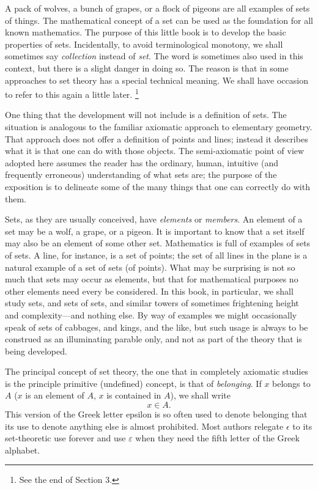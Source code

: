   A pack of wolves, a bunch of grapes, or a flock of pigeons are all examples of sets of things. 
 The mathematical concept of a set can be used as the foundation for all known mathematics. 
 The purpose of this little book is to develop the basic properties of sets. 
 Incidentally, to avoid terminological monotony, we shall sometimes say \textit{collection} instead of \textit{set}. 
 The word  is sometimes also used in this context, but there is a slight danger in doing so. 
 The reason is that in some approaches to set theory  has a special technical meaning. 
 We shall have occasion to refer to this again a little later. 
   \footnote{
     See the end of Section 3. 
   }


 One thing that the development will not include is a definition of sets. 
 The situation is analogous to the familiar axiomatic approach to elementary geometry. 
 That approach does not offer a definition of points and lines; instead it describes what it is that one can do with those objects. 
 The semi-axiomatic point of view adopted here assumes the reader has the ordinary, human, intuitive (and frequently erroneous) understanding of what sets are; the purpose of the exposition is to delineate some of the many things that one can correctly do with them.


  Sets, as they are usually conceived, have \textit{elements} or \textit{members}. 
 An element of a set may be a wolf, a grape, or a pigeon. 
 It is important to know that a set itself may also be an element of some other set. 
 Mathematics is full of examples of sets of sets. 
 A line, for instance, is a set of points; the set of all lines in the plane is a natural example of a set of sets (of points). 
 What may be surprising is not so much that sets may occur as elements, but that for mathematical purposes no other elements need every be considered. 
 In this book, in particular, we shall study sets, and sets of sets, and similar towers of sometimes frightening height and complexity---and nothing else. 
 By way of examples we might occasionally speak of sets of cabbages, and kings, and the like, but such usage is always to be construed as an illuminating parable only, and not as part of the theory that is being developed.


  The principal concept of set theory, the one that in completely axiomatic studies is the principle primitive (undefined) concept, is that of \textit{belonging}. 
 If $x$ belongs to $A$ ($x$ is an element of $A$, $x$ is contained in $A$), we shall write  
\[ x \in A. \]    
 This version of the Greek letter epsilon is so often used to denote belonging that its use to denote anything else is almost prohibited. 
 Most authors relegate $\epsilon$ to its set-theoretic use forever and use $\varepsilon$ when they need the fifth letter of the Greek alphabet. 



